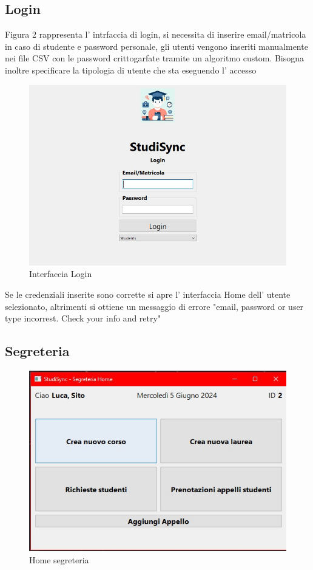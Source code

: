 \documentclass{article}
\begin{document}
\newpage

\subsection{Login}

Figura 2 rappresenta l' intrfaccia di login, si necessita di inserire email/matricola in caso
di studente e password personale, gli utenti vengono inseriti manualmente nei file CSV con le password crittogarfate tramite un algoritmo custom. Bisogna inoltre specificare la tipologia di utente che sta eseguendo l' accesso


\begin{figure}
    \centering
    \includegraphics[width=1\linewidth]{IMG/loging_interface.jpg}
    \caption{Interfaccia Login}
    \label{fig:enter-label}
\end{figure}


Se le credenziali inserite sono corrette si apre l' interfaccia Home dell' utente selezionato, altrimenti si ottiene un messaggio di errore "email, password or user type incorrest. Check your info and retry"

\subsection{Segreteria}

\begin{figure}
    \centering
    \includegraphics[width=0.75\linewidth]{IMG/HomeSegreteria.jpg}
    \caption{Home segreteria}
    \label{fig:enter-label}
\end{figure}
\end{document}
